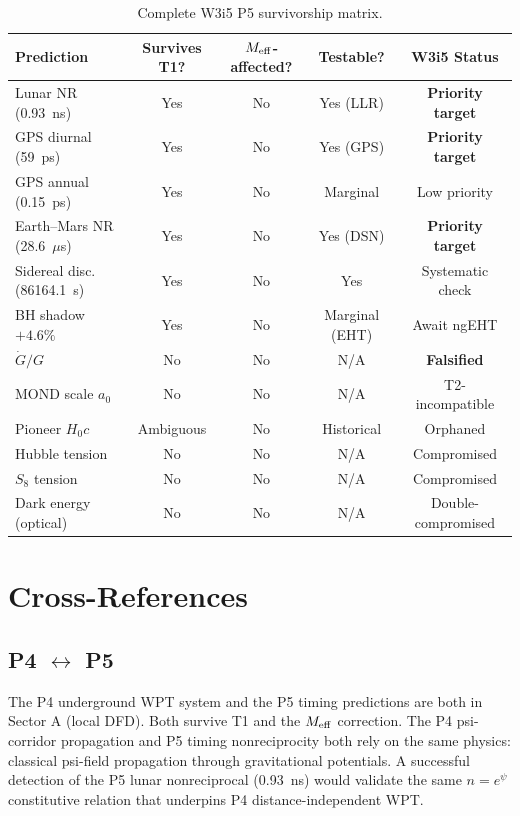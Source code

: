 \documentclass[11pt]{article}
\newcommand{\Meff}{M_{\rm eff}}
\newcommand{\Hzero}{H_0}
\begin{document}
\begin{table}[h]
\centering
\caption{Complete W3i5 P5 survivorship matrix.}
\label{tab:P5-survivorship}
\begin{tabular}{p{3.5cm}cccc}
\toprule
\textbf{Prediction} & \textbf{Survives T1?} & \textbf{$\Meff$-affected?} &
  \textbf{Testable?} & \textbf{W3i5 Status} \\
\midrule
Lunar NR (0.93~ns) & Yes & No & Yes (LLR) & \textbf{Priority target} \\
GPS diurnal (59~ps) & Yes & No & Yes (GPS) & \textbf{Priority target} \\
GPS annual (0.15~ps) & Yes & No & Marginal & Low priority \\
Earth--Mars NR (28.6~$\mu$s) & Yes & No & Yes (DSN) & \textbf{Priority target} \\
Sidereal disc. (86164.1~s) & Yes & No & Yes & Systematic check \\
BH shadow $+4.6\%$ & Yes & No & Marginal (EHT) & Await ngEHT \\
$\dot{G}/G$ & No & No & N/A & \textbf{Falsified} \\
MOND scale $a_0$ & No & No & N/A & T2-incompatible \\
Pioneer $\Hzero c$ & Ambiguous & No & Historical & Orphaned \\
Hubble tension & No & No & N/A & Compromised \\
$S_8$ tension & No & No & N/A & Compromised \\
Dark energy (optical) & No & No & N/A & Double-compromised \\
\bottomrule
\end{tabular}
\end{table}

\section{Cross-References}
\label{sec:crossrefs}

\subsection{P4 $\leftrightarrow$ P5}

The P4 underground WPT system and the P5 timing predictions are both
in Sector A (local DFD). Both survive T1 and the $\Meff$ correction.
The P4 psi-corridor propagation and P5 timing nonreciprocity both rely
on the same physics: classical psi-field propagation through gravitational
potentials. A successful detection of the P5 lunar nonreciprocal (0.93~ns)
would validate the same $n = e^\psi$ constitutive relation that underpins
P4 distance-independent WPT.
\end{document}
